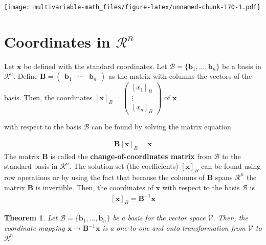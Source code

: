 \documentclass[
]{book}
\newtheorem{theorem}{Theorem}[chapter]
\theoremstyle{definition}
\theoremstyle{definition}
\theoremstyle{definition}
\theoremstyle{definition}
\theoremstyle{remark}
\begin{document}
\texttt{[image: multivariable-math\_files/figure-latex/unnamed-chunk-170-1.pdf]}

\hypertarget{coordinates-in-mathcalrn}{%
\section{\texorpdfstring{Coordinates in \(\mathcal{R}^n\)}{Coordinates in \textbackslash mathcal\{R\}\^{}n}}\label{coordinates-in-mathcalrn}}

Let \(\mathbf{x}\) be defined with the standard coordinates. Let \(\mathcal{B} = \{ \mathbf{b}_1, \ldots, \mathbf{b}_n \}\) be a basis in \(\mathcal{R}^n\). Define \(\mathbf{B} = \begin{pmatrix} \mathbf{b}_1 & \cdots & \mathbf{b}_n \end{pmatrix}\) as the matrix with columns the vectors of the basis. Then, the coordinates \(\left[\mathbf{x}\right]_B = \begin{pmatrix} [x_1]_B \\ \vdots \\ [x_n]_B \end{pmatrix}\) of \(\mathbf{x}\)

with respect to the basis \(\mathcal{B}\) can be found by solving the matrix equation

\[
\begin{aligned}
\mathbf{B} \left[\mathbf{x}\right]_B = \mathbf{x}
\end{aligned}
\]
The matrix \(\mathbf{B}\) is called the \textbf{change-of-coordinates matrix} from \(\mathcal{B}\) to the standard basis in \(\mathcal{R}^n\). The solution set (the coefficients) \(\left[\mathbf{x}\right]_B\) can be found using row operations or by using the fact that because the columns of \(\mathbf{B}\) spans \(\mathcal{R}^n\) the matrix \(\mathbf{B}\) is invertible. Then, the coordinates of \(\mathbf{x}\) with respect to the basis \(\mathcal{B}\) is
\[
\begin{aligned}
\left[\mathbf{x}\right]_B = \mathbf{B}^{-1} \mathbf{x}
\end{aligned}
\]

\begin{theorem}
Let \(\mathcal{B} = \{ \mathbf{b}_1, \ldots, \mathbf{b}_n\}\) be a basis for the vector space \(\mathcal{V}\). Then, the coordinate mapping \(\mathbf{x} \rightarrow \mathbf{B}^{-1} \mathbf{x}\) is a one-to-one and onto transformation from \(\mathcal{V}\) to \(\mathcal{R}^n\)
\end{theorem}
\end{document}
